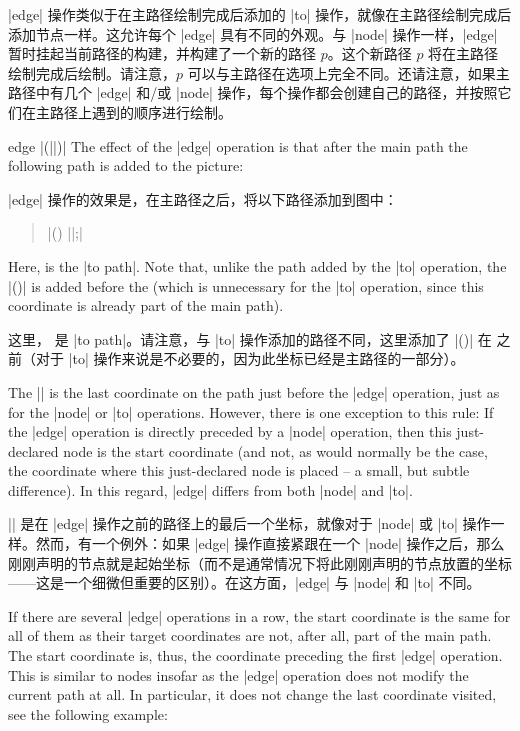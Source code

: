 |edge| 操作类似于在主路径绘制完成后添加的 |to| 操作，就像在主路径绘制完成后添加节点一样。这允许每个 |edge| 具有不同的外观。与 |node| 操作一样，|edge| 暂时挂起当前路径的构建，并构建了一个新的路径 $p$。这个新路径 $p$ 将在主路径绘制完成后绘制。请注意，$p$ 可以与主路径在选项上完全不同。还请注意，如果主路径中有几个 |edge| 和/或 |node| 操作，每个操作都会创建自己的路径，并按照它们在主路径上遇到的顺序进行绘制。

\begin{pathoperation}{edge}{  |(||)|}
    The effect of the |edge| operation is that after the main path the
    following path is added to the picture:
    
    |edge| 操作的效果是，在主路径之后，将以下路径添加到图中：

    \begin{quote}
        | (\tikztostart) ||;|
    \end{quote}
    Here,  is the |to path|. Note that, unlike the path added by the
    |to| operation, the |(\tikztostart)| is added before the  (which
    is unnecessary for the |to| operation, since this coordinate is already
    part of the main path).

    这里， 是 |to path|。请注意，与 |to| 操作添加的路径不同，这里添加了 |(\tikztostart)| 在  之前（对于 |to| 操作来说是不必要的，因为此坐标已经是主路径的一部分）。

    The |\tikztostart| is the last coordinate on the path just before the
    |edge| operation, just as for the |node| or |to| operations. However, there
    is one exception to this rule: If the |edge| operation is directly preceded
    by a |node| operation, then this just-declared node is the start coordinate
    (and not, as would normally be the case, the coordinate where this
    just-declared node is placed -- a small, but subtle difference). In this
    regard, |edge| differs from both |node| and |to|.

    |\tikztostart| 是在 |edge| 操作之前的路径上的最后一个坐标，就像对于 |node| 或 |to| 操作一样。然而，有一个例外：如果 |edge| 操作直接紧跟在一个 |node| 操作之后，那么刚刚声明的节点就是起始坐标（而不是通常情况下将此刚刚声明的节点放置的坐标——这是一个细微但重要的区别）。在这方面，|edge| 与 |node| 和 |to| 不同。

    If there are several |edge| operations in a row, the start coordinate is
    the same for all of them as their target coordinates are not, after all,
    part of the main path. The start coordinate is, thus, the coordinate
    preceding the first |edge| operation. This is similar to nodes insofar as
    the |edge| operation does not modify the current path at all. In
    particular, it does not change the last coordinate visited, see the
    following example:
    

\end{pathoperation}
